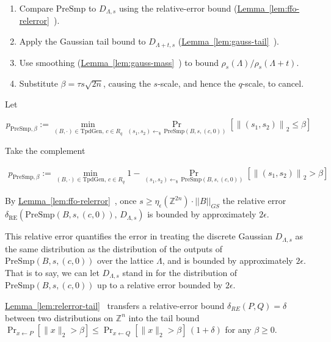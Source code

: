 \begin{enumerate}
\def\labelenumi{\arabic{enumi}.}
\tightlist
\item
  Compare \(\mathrm{PreSmp}\) to \(D_{\Lambda,s}\) using the
  relative-error bound (\hyperref[lem:ffo-relerror]{Lemma~\ref*{lem:ffo-relerror}}~\cite{Fouque2024CoreFalcon}).
\item
  Apply the Gaussian tail bound to \(D_{\Lambda+t,s}\) (\hyperref[lem:gauss-tail]{Lemma~\ref*{lem:gauss-tail}}~\cite{Fouque2024CoreFalcon}).
\item
  Use smoothing (\hyperref[lem:gauss-mass]{Lemma~\ref*{lem:gauss-mass}}~\cite{Fouque2024CoreFalcon}) to bound
  \(\rho_s(\Lambda)/\rho_s(\Lambda+t)\).
\item
  Substitute \(\beta = \tau s \sqrt{2n}\), causing the \(s\)-scale, and
  hence the \(q\)-scale, to cancel.
\end{enumerate}

Let

\[
p_{\mathrm{PreSmp},\beta}
:=
\min_{(B,\cdot)\in \mathrm{TpdGen},\, c\in R_q}
\Pr_{(s_1,s_2)\gets_{\$}\, \mathrm{PreSmp}(B,s,(c,0))}
\left[
\left\|(s_1,s_2)\right\|_2 \le \beta
\right]
\]

Take the complement

\[
\begin{aligned}
p_{\mathrm{PreSmp},\beta}
:=
\min_{(B,\cdot)\in \mathrm{TpdGen},\, c\in R_q}
1 -
\Pr_{(s_1,s_2)\gets_{\$}\, \mathrm{PreSmp}(B,s,(c,0))}
\!\left[\left\|(s_1,s_2)\right\|_2 > \beta\right]
\end{aligned}
\]

By \hyperref[lem:ffo-relerror]{Lemma~\ref*{lem:ffo-relerror}}~\cite{Fouque2024CoreFalcon},
once \(s \ge \eta_\epsilon(\mathbb{Z}^{2n}) \cdot ||B||_{GS}\) the relative error
\(\delta_{\mathrm{RE}}(\mathrm{PreSmp}(B,s,(c,0)),\, D_{\Lambda,s})\) is bounded by
approximately \(2\epsilon\).

This relative error quantifies the error in treating the discrete
Gaussian \(D_{\Lambda,s}\) as the same distribution as the distribution
of the outputs of \(\mathrm{PreSmp}(B,s,(c,0))\) over the lattice
\(\Lambda\), and is bounded by approximately \(2\epsilon\). That is to
say, we can let \(D_{\Lambda,s}\) stand in for the distribution of
\(\mathrm{PreSmp}(B,s,(c,0))\) up to a relative error bounded by
\(2\epsilon\).

\hyperref[lem:relerror-tail]{Lemma~\ref*{lem:relerror-tail}}~\cite{Fouque2024CoreFalcon}
transfers a relative-error bound \(\delta_{RE}(P,Q) = \delta\) between two
distributions on \(\mathbb{Z}^n\) into the tail bound
\(\Pr_{x \leftarrow P}[\|x\|_2 > \beta] \le \Pr_{x \leftarrow Q}[\|x\|_2 > \beta]\,(1+\delta)\)
for any \(\beta \ge 0\).

